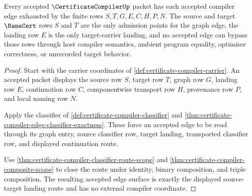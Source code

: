 \begin{theorem}
\label{thm:certificate-compiler-source-target-landing-exhaustion}
Every accepted $\CertificateCompilerUp$ packet has each accepted compiler
edge exhausted by the finite rows $S,T,G,E,C,H,P,N$. The source and target
$\NameCert$ rows $S$ and $T$ are the only admission points for the graph
edge, the landing row $E$ is the only target-carrier landing, and no accepted
edge can bypass those rows through host compiler semantics, ambient program
equality, optimiser correctness, or unrecorded target behavior.
\end{theorem}
\begin{proof}
Start with the carrier coordinates of
\autoref{def:certificate-compiler-carrier}. An accepted packet displays the
source row $S$, target row $T$, graph row $G$, landing row $E$,
continuation row $C$, componentwise transport row $H$, provenance row $P$,
and local naming row $N$.

Apply the classifier of \autoref{def:certificate-compiler-classifier} and
\autoref{thm:certificate-compiler-edge-classifier-exactness}. These force an
accepted edge to be read through its graph entry, source classifier row,
target landing, transported classifier row, and displayed continuation route.

Use \autoref{thm:certificate-compiler-classifier-route-scope} and
\autoref{thm:certificate-compiler-composite-scope} to close the route under
identity, binary composition, and triple composition. The resulting accepted
edge surface is exactly the displayed source-target landing route and has no
external compiler coordinate.
\end{proof}

